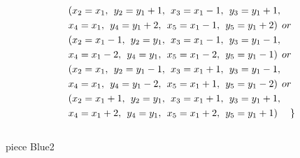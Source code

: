 \begin{align*}
&(x_{2} = x_{1},\hspace{1ex}y_{2} = y_{1}+1,\hspace{1ex}x_{3} = x_{1}-1,\hspace{1ex}y_{3} = y_{1}+1,
\\&x_{4} = x_{1},\hspace{1ex}y_{4} = y_{1}+2,\hspace{1ex}x_{5} = x_{1}-1,\hspace{1ex}y_{5} = y_{1}+2)\hspace{1ex} or \\
&(x_{2} = x_{1}-1 ,\hspace{1ex}y_{2} = y_{1},\hspace{1ex}x_{3} = x_{1}-1,\hspace{1ex}y_{3} = y_{1}-1,
\\&x_{4} = x_{1}-2,\hspace{1ex}y_{4} = y_{1},\hspace{1ex}x_{5} = x_{1}-2,\hspace{1ex}y_{5} = y_{1}-1)\hspace{1ex} or \\
&(x_{2} = x_{1} ,\hspace{1ex}y_{2} = y_{1}-1,\hspace{1ex}x_{3} = x_{1}+1,\hspace{1ex}y_{3} = y_{1}-1,
\\&x_{4} = x_{1},\hspace{1ex}y_{4} = y_{1}-2,\hspace{1ex}x_{5} = x_{1}+1,\hspace{1ex}y_{5} = y_{1}-2)\hspace{1ex} or \\
&(x_{2} = x_{1}+1 ,\hspace{1ex}y_{2} = y_{1},\hspace{1ex}x_{3} = x_{1}+1,\hspace{1ex}y_{3} = y_{1}+1,
\\&x_{4} = x_{1}+2,\hspace{1ex}y_{4} = y_{1},\hspace{1ex}x_{5} = x_{1}+2,\hspace{1ex}y_{5} = y_{1}+1)\hspace{3ex}\}
\end{align*}  
\\ piece Blue2 
